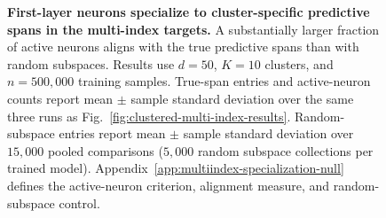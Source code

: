 \documentclass{article}
\newcounter{model}[section]
\begin{document}
\begin{figure}
\begin{table}[H]
    \centering
    \small
    \renewcommand{\arraystretch}{1.15}
    \setlength{\tabcolsep}{4pt}
    \caption{\textbf{First-layer neurons specialize to cluster-specific
    predictive spans in the multi-index targets.}
    A substantially larger fraction of active neurons aligns with the true
    predictive spans than with random subspaces. Results use \(d=50\),
    \(K=10\) clusters, and \(n=500{,}000\) training samples.
    True-span entries and active-neuron counts report mean \(\pm\) sample standard
    deviation over the same three runs as
    Fig.~\ref{fig:clustered-multi-index-results}. Random-subspace entries
    report mean \(\pm\) sample standard deviation over \(15{,}000\) pooled
    comparisons (\(5{,}000\) random subspace collections per trained model).
    Appendix~\ref{app:multiindex-specialization-null} defines the
    active-neuron criterion, alignment measure, and random-subspace control.}
    \label{tab:multiindex-mixed-k10-span-specialization}
\end{table}


\end{figure}
\end{document}
